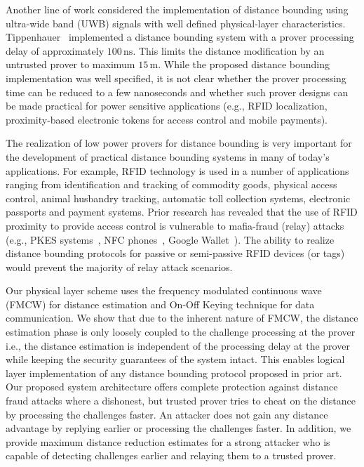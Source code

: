 \documentclass{sig-alternate-10pt}
\newcommand{\eg}{e.g.,\xspace}
\newcommand{\ie}{i.e.,\xspace}
\newcommand{\unit}[1]{\ensuremath{\, \mathrm{#1}}}
\begin{document}
Another line of work considered the implementation of distance bounding using
ultra-wide band (UWB) signals with well defined physical-layer characteristics.
Tippenhauer~\cite{Tippenhauer12} implemented a distance bounding system with a
prover processing delay of approximately $100\unit{ns}$. This limits the
distance modification by an untrusted prover to maximum $15\unit{m}$. While the
proposed distance bounding implementation was well specified, it is not clear
whether the prover processing time can be reduced to a few nanoseconds and
whether such prover designs can be made practical for power sensitive
applications (e.g., RFID localization, proximity-based electronic tokens for
access control and mobile payments).

The realization of low power provers for distance bou\-nding is very important
for the development of practical distance bounding systems in many of today's
applications. For example, RFID technology is used in a number of applications
ranging from identification and tracking of commodity goods, physical access
control, animal husbandry tracking, automatic toll collection systems,
electronic passports and payment systems. Prior research has revealed that the
use of RFID proximity to provide access control is vulnerable to mafia-fraud
(relay) attacks (\eg PKES systems~\cite{FrancillonFeb11}, NFC
phones~\cite{FrancisDec10}, Google Wallet~\cite{RolandSep12}). The ability to
realize distance bounding protocols for passive or semi-passive RFID devices (or
tags) would prevent the majority of relay attack scenarios.

Our physical layer scheme uses the frequency modulated continuous wave (FMCW)
for distance estimation and On-Off Keying technique for data communication. We
show that due to the inherent nature of FMCW, the distance estimation phase is
only loosely coupled to the challenge processing at the prover \ie the distance
estimation is independent of the processing delay at the prover while keeping
the security guarantees of the system intact. This enables logical layer
implementation of any distance bounding protocol proposed in prior art. Our
proposed system architecture offers complete protection against distance fraud
attacks where a dishonest, but trusted prover tries to cheat on the distance by
processing the challenges faster. An attacker does not gain any distance
advantage by replying earlier or processing the challenges faster. In addition,
we provide maximum distance reduction estimates for a strong attacker who is
capable of detecting challenges earlier and relaying them to a trusted prover.
\end{document}
